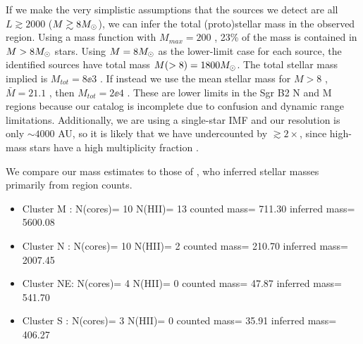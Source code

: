 \documentclass{emulateapj}
\newcommand{\ncores}{138\xspace}
\begin{document}
If we make the very simplistic assumptions that the sources we detect are all
$L\gtrsim2000$ \lsun ($M\gtrsim8 M_{\odot}$), 
we can infer the total (proto)stellar mass in the observed region.
Using a \citet{Kroupa2001a} mass function with $M_{max}=200$ \msun, 23\% of
the mass is contained in $M>8M_{\odot}$ stars.  Using $M=8M_{\odot}$ as the lower-limit
case for each source, the identified sources have total mass $M(>8)=1800M_{\odot}$.
The total stellar mass implied is $M_{tot} = 8\ee{3}$ \msun.  If instead we use the
mean stellar mass for $M>8$ \msun, $\bar{M}=21.1$ \msun, then $M_{tot}=2\ee{4}$
\msun.  These are lower limits in the Sgr B2 N and M regions because our
catalog is incomplete due to confusion and dynamic range limitations.
Additionally, we are using a single-star IMF and our resolution is only $\sim4000$
AU, so it is likely that we have undercounted by $\gtrsim2\times$, since high-mass
stars have a high multiplicity fraction \citep{Mason2009a}.


We compare our mass estimates to those of \citet{Schmiedeke2016a}, who inferred
stellar masses primarily from \hii region counts.

\begin{itemize}
    \item Cluster M : N(cores)= 10 N(HII)= 13 counted mass=    711.30 inferred mass=   5600.08
    \item Cluster N : N(cores)= 10 N(HII)=  2 counted mass=    210.70 inferred mass=   2007.45
    \item Cluster NE: N(cores)=  4 N(HII)=  0 counted mass=     47.87 inferred mass=    541.70
    \item Cluster S : N(cores)=  3 N(HII)=  0 counted mass=     35.91 inferred mass=    406.27
\end{itemize}



% 
\end{document}

